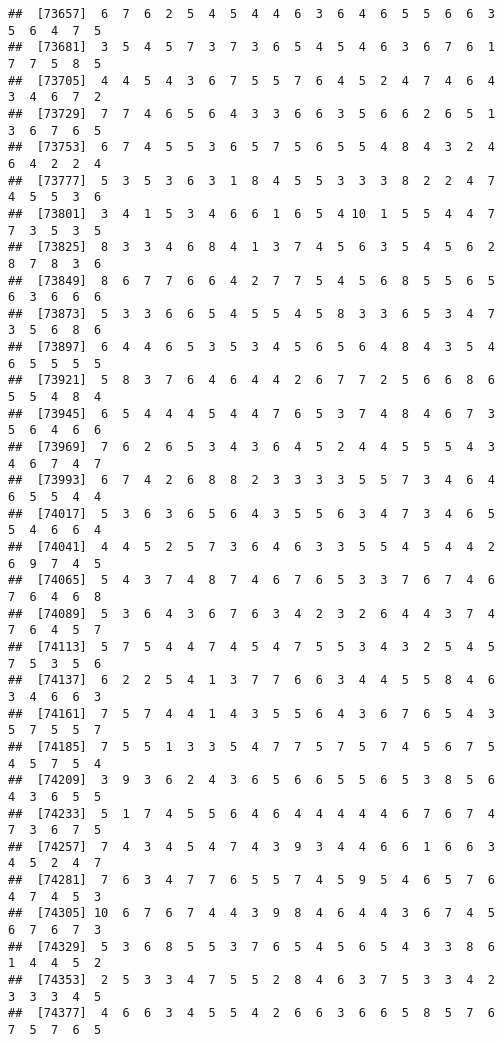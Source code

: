\documentclass[
]{book}
\begin{document}
\begin{verbatim}
##  [73657]  6  7  6  2  5  4  5  4  4  6  3  6  4  6  5  5  6  6  3  5  6  4  7  5
##  [73681]  3  5  4  5  7  3  7  3  6  5  4  5  4  6  3  6  7  6  1  7  7  5  8  5
##  [73705]  4  4  5  4  3  6  7  5  5  7  6  4  5  2  4  7  4  6  4  3  4  6  7  2
##  [73729]  7  7  4  6  5  6  4  3  3  6  6  3  5  6  6  2  6  5  1  3  6  7  6  5
##  [73753]  6  7  4  5  5  3  6  5  7  5  6  5  5  4  8  4  3  2  4  6  4  2  2  4
##  [73777]  5  3  5  3  6  3  1  8  4  5  5  3  3  3  8  2  2  4  7  4  5  5  3  6
##  [73801]  3  4  1  5  3  4  6  6  1  6  5  4 10  1  5  5  4  4  7  7  3  5  3  5
##  [73825]  8  3  3  4  6  8  4  1  3  7  4  5  6  3  5  4  5  6  2  8  7  8  3  6
##  [73849]  8  6  7  7  6  6  4  2  7  7  5  4  5  6  8  5  5  6  5  6  3  6  6  6
##  [73873]  5  3  3  6  6  5  4  5  5  4  5  8  3  3  6  5  3  4  7  3  5  6  8  6
##  [73897]  6  4  4  6  5  3  5  3  4  5  6  5  6  4  8  4  3  5  4  6  5  5  5  5
##  [73921]  5  8  3  7  6  4  6  4  4  2  6  7  7  2  5  6  6  8  6  5  5  4  8  4
##  [73945]  6  5  4  4  4  5  4  4  7  6  5  3  7  4  8  4  6  7  3  5  6  4  6  6
##  [73969]  7  6  2  6  5  3  4  3  6  4  5  2  4  4  5  5  5  4  3  4  6  7  4  7
##  [73993]  6  7  4  2  6  8  8  2  3  3  3  3  5  5  7  3  4  6  4  6  5  5  4  4
##  [74017]  5  3  6  3  6  5  6  4  3  5  5  6  3  4  7  3  4  6  5  5  4  6  6  4
##  [74041]  4  4  5  2  5  7  3  6  4  6  3  3  5  5  4  5  4  4  2  6  9  7  4  5
##  [74065]  5  4  3  7  4  8  7  4  6  7  6  5  3  3  7  6  7  4  6  7  6  4  6  8
##  [74089]  5  3  6  4  3  6  7  6  3  4  2  3  2  6  4  4  3  7  4  7  6  4  5  7
##  [74113]  5  7  5  4  4  7  4  5  4  7  5  5  3  4  3  2  5  4  5  7  5  3  5  6
##  [74137]  6  2  2  5  4  1  3  7  7  6  6  3  4  4  5  5  8  4  6  3  4  6  6  3
##  [74161]  7  5  7  4  4  1  4  3  5  5  6  4  3  6  7  6  5  4  3  5  7  5  5  7
##  [74185]  7  5  5  1  3  3  5  4  7  7  5  7  5  7  4  5  6  7  5  4  5  7  5  4
##  [74209]  3  9  3  6  2  4  3  6  5  6  6  5  5  6  5  3  8  5  6  4  3  6  5  5
##  [74233]  5  1  7  4  5  5  6  4  6  4  4  4  4  4  6  7  6  7  4  7  3  6  7  5
##  [74257]  7  4  3  4  5  4  7  4  3  9  3  4  4  6  6  1  6  6  3  4  5  2  4  7
##  [74281]  7  6  3  4  7  7  6  5  5  7  4  5  9  5  4  6  5  7  6  4  7  4  5  3
##  [74305] 10  6  7  6  7  4  4  3  9  8  4  6  4  4  3  6  7  4  5  6  7  6  7  3
##  [74329]  5  3  6  8  5  5  3  7  6  5  4  5  6  5  4  3  3  8  6  1  4  4  5  2
##  [74353]  2  5  3  3  4  7  5  5  2  8  4  6  3  7  5  3  3  4  2  3  3  3  4  5
##  [74377]  4  6  6  3  4  5  5  4  2  6  6  3  6  6  5  8  5  7  6  7  5  7  6  5

\end{verbatim}
\end{document}
